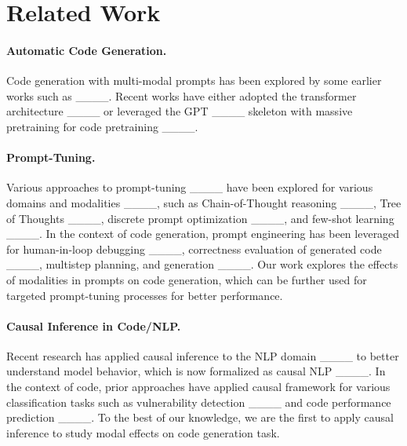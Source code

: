 \section{Related Work}
\paragraph{Automatic Code Generation.}
Code generation with multi-modal prompts has been explored by some earlier works such as ____. Recent works have either adopted the transformer architecture ____ or leveraged the GPT ____ skeleton with massive pretraining for code pretraining ____.

\paragraph{Prompt-Tuning.} 
Various approaches to prompt-tuning ____ have been explored for various domains and modalities ____, such as Chain-of-Thought reasoning ____, Tree of Thoughts ____, discrete prompt optimization ____, and few-shot learning ____. In the context of code generation, prompt engineering has been leveraged for human-in-loop debugging ____, correctness evaluation of generated code ____, multistep planning, and generation ____. Our work explores the effects of modalities in prompts on code generation, which can be further used for targeted prompt-tuning processes for better performance.

\paragraph{Causal Inference in Code/NLP.} 
Recent research has applied causal inference to the NLP domain ____ to better understand model behavior, which is now formalized as causal NLP ____. 
In the context of code, prior approaches have applied causal framework for various classification tasks such as vulnerability detection ____ and code performance prediction ____.
To the best of our knowledge, we are the first to apply causal inference to study modal effects on code generation task.